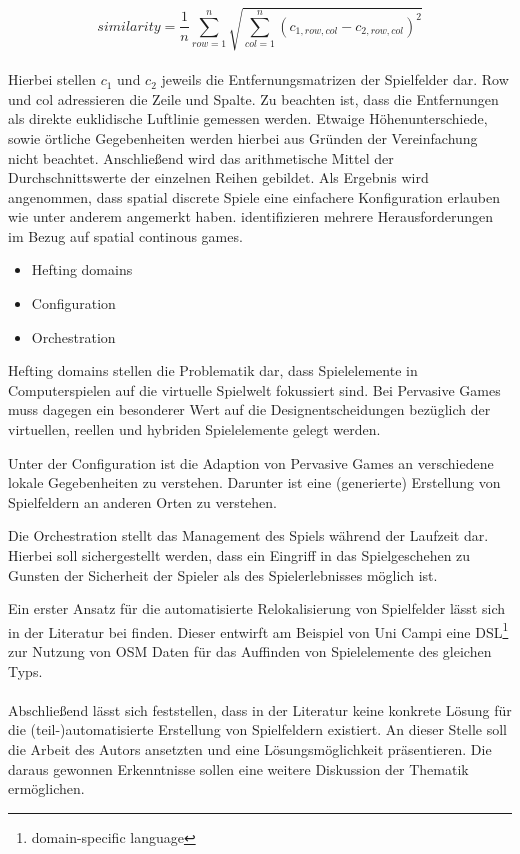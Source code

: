 \begin{equation}
similarity = \frac{1}{n} \sum_{row=1}^{n} \sqrt{ \sum_{col=1}^{n} (c_{1,row,col} - c_{2,row,col})^2 }
\end{equation}
\\
Hierbei stellen $c_1$ und $c_2$ jeweils die Entfernungsmatrizen der Spielfelder dar.
Row und col adressieren die Zeile und Spalte.
Zu beachten ist, dass die Entfernungen als direkte euklidische Luftlinie gemessen werden. Etwaige Höhenunterschiede, sowie örtliche Gegebenheiten werden hierbei aus Gründen der Vereinfachung nicht beachtet. Anschließend wird das arithmetische Mittel der Durchschnittswerte der einzelnen Reihen gebildet.
Als Ergebnis wird angenommen, dass spatial discrete Spiele eine einfachere Konfiguration erlauben wie unter anderem \textcite{Benford.2005} angemerkt haben.
\textcite{Benford.2005} identifizieren mehrere Herausforderungen im Bezug auf spatial continous games.

\begin{itemize}
\item Hefting domains
\item Configuration
\item Orchestration
\end{itemize}

Hefting domains stellen die Problematik dar, dass Spielelemente in Computerspielen auf die virtuelle Spielwelt fokussiert sind. Bei Pervasive Games muss dagegen ein besonderer Wert auf die Designentscheidungen bezüglich der virtuellen, reellen und hybriden Spielelemente gelegt werden.

Unter der Configuration ist die Adaption von Pervasive Games an verschiedene lokale Gegebenheiten zu verstehen. Darunter ist eine  (generierte) Erstellung von Spielfeldern an anderen Orten zu verstehen.

Die Orchestration stellt das Management des Spiels während der Laufzeit dar. Hierbei soll sichergestellt werden, dass ein Eingriff in das Spielgeschehen zu Gunsten der Sicherheit der Spieler als des Spielerlebnisses möglich ist.

Ein erster Ansatz für die automatisierte Relokalisierung von Spielfelder lässt sich in der Literatur bei \textcite{Mannara.2012} finden. Dieser entwirft am Beispiel von Uni Campi eine DSL\footnote{domain-specific language} zur Nutzung von OSM Daten für das Auffinden von Spielelemente des gleichen Typs.
\\\\
Abschließend lässt sich feststellen, dass in der Literatur keine konkrete Lösung für die (teil-)automatisierte Erstellung von Spielfeldern existiert.
An dieser Stelle soll die Arbeit des Autors ansetzten und eine Lösungsmöglichkeit präsentieren.
Die daraus gewonnen Erkenntnisse sollen eine weitere Diskussion der Thematik ermöglichen.

